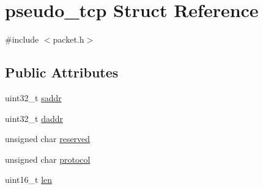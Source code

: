 \hypertarget{structpseudo__tcp}{\section{pseudo\-\_\-tcp Struct Reference}
\label{structpseudo__tcp}
}


{\ttfamily \#include $<$packet.\-h$>$}

\subsection*{Public Attributes}
\begin{DoxyCompactItemize}
\item 
uint32\-\_\-t \hyperlink{structpseudo__tcp_af36926d74005032f8a55cdc9e7d3c456}{saddr}
\item 
uint32\-\_\-t \hyperlink{structpseudo__tcp_a06460250f9953c76b2fadbddf9164e16}{daddr}
\item 
unsigned char \hyperlink{structpseudo__tcp_a1ffb91e2c0f6b4ae0921c54dc6a9d3fd}{reserved}
\item 
unsigned char \hyperlink{structpseudo__tcp_a14eb816e33e077b9cc1db31cb1e382ca}{protocol}
\item 
uint16\-\_\-t \hyperlink{structpseudo__tcp_a6eaab74d426119b254099bb7616d2e61}{len}
\end{DoxyCompactItemize}


